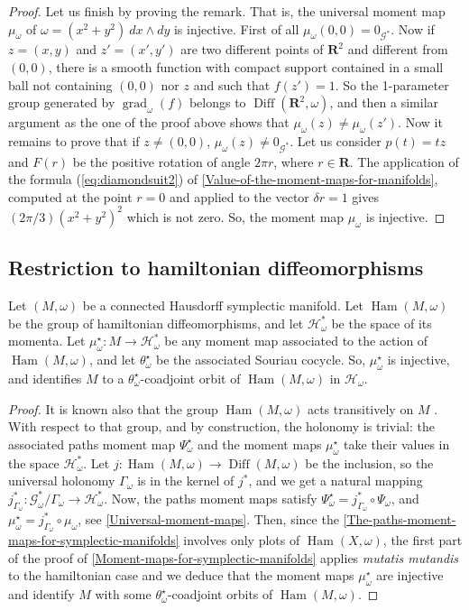 \documentclass[10pt,reqno,twoside]{amsart}
\newcommand{\RR}{\mathbf{R}}
\newcommand{\cG}{\mathcal{G}}
\newcommand{\cH}{\mathcal{H}}
\DeclareMathOperator{\Diff}{Diff}
\DeclareMathOperator{\Ham}{Ham}
\DeclareMathOperator{\grad}{grad}
\theoremstyle{plain}
\theoremstyle{definition}
\newcommand{\article}[1]{\subsection{#1}}
\begin{document}
\begin{proof}
    Let us finish by proving the remark.
    That is,
    the universal moment map $\mu_\omega$ of $\omega = (x^2 + y^2)\ dx \wedge dy$ is injective.
    First of all $\mu_\omega(0,0) = 0_{\cG^*}$.
    Now if $z=(x,y)$ and $z' =(x',y')$ are two different points of $\RR^2$ and different from $(0,0)$,
    there is a smooth function with compact support contained in a small ball not containing $(0,0)$ nor $z$ and such that $f(z')=1$.
    So the 1-parameter group generated by $\grad_\omega(f)$ belongs to $\Diff(\RR^2,\omega)$,
    and then a similar argument as the one of the proof above shows that $\mu_\omega(z) \neq \mu_\omega(z')$.
    Now it remains to prove that if $z \neq (0,0)$,
    $\mu_\omega(z) \neq 0_{\cG^*}$.
    Let us consider $p(t) = tz$ and $F(r)$ be the positive rotation of angle $2\pi r$,
    where $r \in \RR$.
    The application of the formula (\ref{eq:diamondsuit2}) of \ref{Value-of-the-moment-maps-for-manifolds},
    computed at the point $r=0$ and applied to the vector $\delta r =1$ gives $(2\pi/3) (x^2+y^2)^2$ which is not zero.
    So,
    the moment map $\mu_\omega$ is injective.
  \end{proof}
  
  \article{Restriction to hamiltonian diffeomorphisms}
  \label{Restriction-to-hamiltonian-diffeomorphisms}
  Let $(M,\omega)$ be a connected Hausdorff symplectic manifold.
  Let $\Ham(M,\omega)$ be the group of hamiltonian diffeomorphisms,
  and let $\cH^*_\omega$ be the space of its momenta.
  Let $\mu_\omega^\star : M \to \cH^*_\omega$ be any moment map associated to the action of $\Ham(M,\omega)$,
  and let $\theta_\omega^\star$ be the associated Souriau cocycle.
  So,
  $\mu_\omega^\star$ is injective,
  and identifies $M$ to a $\theta_\omega^\star$-coadjoint orbit of $\Ham(M,\omega)$ in $\cH_\omega$.
  
  \begin{proof}
    It is known also that the group $\Ham(M,\omega)$ acts transitively on $M$ \cite{Boo69}.
    With respect to that group,
    and by construction,
    the holonomy is trivial:
    the associated paths moment map $\Psi_\omega^\star$ and the moment maps $\mu_\omega^\star$ take their values in the space $\cH^*_\omega$.
    Let $j : \Ham(M,\omega) \to \Diff(M,\omega)$ be the inclusion,
    so the universal holonomy $\Gamma_\omega$ is in the kernel of $j^*$,
    and we get a natural mapping $j^*_{\Gamma_\omega} : \cG^*_\omega/\Gamma_\omega \to \cH^*_\omega$.
    Now,
    the paths moment maps satisfy $\Psi_\omega^\star = j^*_{\Gamma_\omega} \circ \Psi_\omega$,
    and $\mu_\omega^\star = j^*_{\Gamma_\omega} \circ \mu_\omega$,
    see \ref{Universal-moment-maps}.
    Then,
    since the \ref{The-paths-moment-maps-for-symplectic-manifolds} involves only plots of $\Ham(X,\omega)$,
    the first part of the proof of \ref{Moment-maps-for-symplectic-manifolds} applies {\em mutatis mutandis} to the hamiltonian case and we deduce that the moment maps $\mu_\omega^\star$ are injective and identify $M$ with some $\theta_\omega^\star$-coadjoint orbits of $\Ham(M,\omega)$.
  \end{proof}
  
\end{document}

